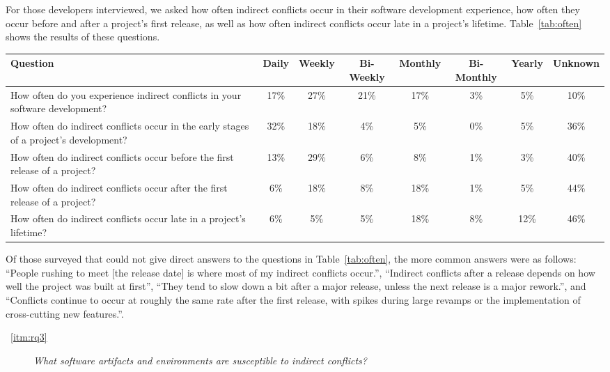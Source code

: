 \documentclass[conference]{IEEEtran}
\begin{document}
For those developers interviewed, we asked how often indirect conflicts occur in their software development experience,
how often they occur before and after a project's first release, as well as how often indirect conflicts occur late
in a project's lifetime. Table~\ref{tab:often} shows the results of these questions.

\begin{table*}[tb!]
\begin{center}
\begin{tabular}{| p{7cm} | c | c | c | c | c | c | c |}
\hline
Question & Daily & Weekly & Bi-Weekly & Monthly & Bi-Monthly & Yearly & Unknown \\
\hline
\hline
How often do you experience indirect conflicts in your software development? & 17\% & 27\% & 21\% & 17\% & 3\% & 5\% & 10\% \\ \hline
How often do indirect conflicts occur in the early stages of a project’s development? & 32\% & 18\% & 4\% & 5\% & 0\% & 5\% & 36\% \\ \hline
How often do indirect conflicts occur before the first release of a project? & 13\% & 29\% & 6\% & 8\% & 1\% & 3\% & 40\% \\ \hline
How often do indirect conflicts occur after the first release of a project? & 6\% & 18\% & 8\% & 18\% & 1\% & 5\% & 44\% \\ \hline
How often do indirect conflicts occur late in a project’s lifetime? & 6\% & 5\% & 5\% & 18\% & 8\% & 12\% & 46\% \\ \hline
\end{tabular}
\end{center}
\caption{Results of survey questions to how often indirect conflicts occur, in terms of percentage
of developers surveyed.\label{tab:often}}
\end{table*}

Of those surveyed that could not give direct answers to the questions in Table~\ref{tab:often}, the more common answers were 
as follows: ``People rushing to meet [the release date] is where most of my indirect conflicts occur.'', ``Indirect conflicts
after a release depends on how well the project was built at first'', ``They tend to slow down a bit after a major release, 
unless the next release is a major rework.'', and ``Conflicts continue to occur at roughly the same rate after the first release,
with spikes during large revamps or the implementation of cross-cutting new features.''.

\begin{description}
	\item[~\ref{itm:rq3}] \textit{What software artifacts and environments are susceptible to indirect conflicts?}
\end{description}
\end{document}
